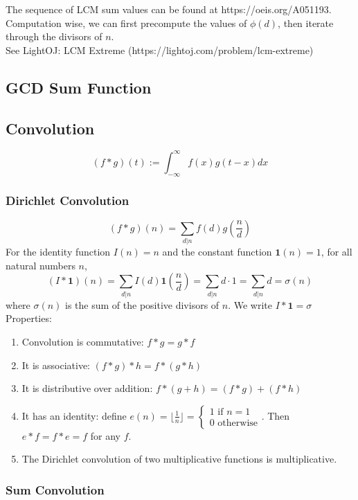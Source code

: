 \documentclass[12pt]{extarticle}
\begin{document}
The sequence of LCM sum values can be found at https://oeis.org/A051193.\\
Computation wise, we can first precompute the values of $\phi(d)$, then iterate through the divisors of $n$.\\
See LightOJ: LCM Extreme (https://lightoj.com/problem/lcm-extreme)

\subsection*{GCD Sum Function}


\subsection*{Convolution}
$$(f*g)(t) := \int_{-\infty}^{\infty}f(x)g(t-x)dx$$
\subsubsection*{Dirichlet Convolution}
$$(f*g)(n)=\sum_{d|n}f(d)g(\frac{n}{d})$$
For the identity function $I(n)=n$ and the constant function $\mathbf{1}(n)=1$, for all natural numbers $n$, $$(I * \mathbf{1})(n)=\sum_{d|n}I(d)\mathbf{1}(\frac{n}{d})=\sum_{d|n}d\cdot 1=\sum_{d|n}d=\sigma(n)$$ where $\sigma(n)$ is the sum of the positive divisors of $n$. We write $I*\mathbf{1}=\sigma$\\
Properties:
\begin{enumerate}
\item Convolution is commutative: $f*g=g*f$
\item It is associative: $(f*g)*h=f*(g*h)$
\item It is distributive over addition: $f*(g+h)=(f*g)+(f*h)$
\item It has an identity: define $e(n)=\lfloor\frac{1}{n}\rfloor=\begin{cases}1 \text{ if } n=1 \\ 0 \text{ otherwise} \end{cases}$. Then $e*f=f*e=f$ for any $f$.
\item The Dirichlet convolution of two multiplicative functions is multiplicative.
\end{enumerate}
\subsubsection*{Sum Convolution}
\end{document}
